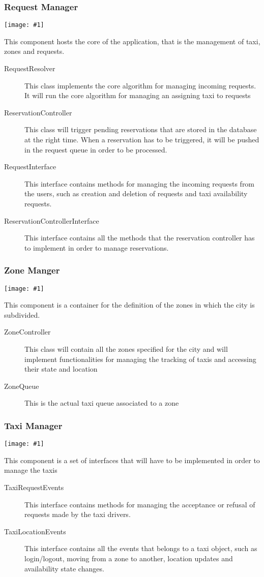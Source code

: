 \documentclass[11pt, a4paper,titlepage]{article}
\newcommand{\image}[1]{
	\begin{center}
		\noindent \texttt{[image: \#1]}
	\end{center}
	}
\begin{document}
 \subsubsection{Request Manager}
	 \image{diagram_class_request.png}
	 This component hosts the core of the application, that is the management of taxi, zones and requests.
	  \begin{description}
	  	\item[RequestResolver] This class implements the core algorithm for managing incoming requests. It will run the core algorithm for managing an assigning taxi to requests
	  	\item[ReservationController] This class will trigger pending reservations that are stored in the database at the right time. When a reservation has to be triggered, it will be pushed in the request queue in order to be processed.
	  	\item[RequestInterface] This interface contains methods for managing the incoming requests from the users, such as creation and deletion of requests and taxi availability requests.
	  	\item[ReservationControllerInterface] This interface contains all the methods that the reservation controller has to implement in order to manage reservations.
	  \end{description}
	  \newpage
 \subsubsection{Zone Manger}
	  \image{diagram_class_zone.png}
	  This component is a container for the definition of the zones in which the city is subdivided.
	  \begin{description}
	  	\item[ZoneController] This class will contain all the zones specified for the city and will implement functionalities for managing the tracking of taxis and accessing their state and location
	  	\item[ZoneQueue] This is the actual taxi queue associated to a zone
	  \end{description}
	  \newpage
 \subsubsection{Taxi Manager}
	 \image{diagram_class_taxi.png}
	 This component is a set of interfaces that will have to be implemented in order to manage the taxis
	 \begin{description}
	 	\item[TaxiRequestEvents] This interface contains methods for managing the acceptance or refusal of requests made by the taxi drivers.
	 	\item[TaxiLocationEvents] This interface contains all the events that belongs to a taxi object, such as login/logout, moving from a zone to another, location updates and availability state changes.
	 \end{description}
	 \newpage
\end{document}

